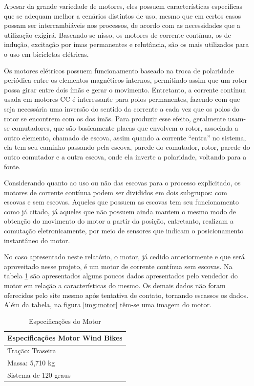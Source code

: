 \newpage
Apesar da grande variedade de motores, eles possuem características específicas que se adequam melhor a cenários distintos de uso, mesmo que em certos casos possam ser intercambiáveis nos processos, de acordo com as necessidades que a utilização exigirá. Baseando-se nisso, os motores de corrente contínua, os de indução, excitação por imas permanentes e relutância, são os mais utilizados para o uso em bicicletas elétricas.

Os motores elétricos possuem funcionamento baseado na troca de polaridade periódica entre os elementos magnéticos internos, permitindo assim que um rotor possa girar entre dois ímãs e gerar o movimento. Entretanto, a corrente contínua usada em motores CC é interessante para polos permanentes, fazendo com que seja necessária uma inversão do sentido da corrente a cada vez que os polos do rotor se encontrem com os dos ímãs. Para produzir esse efeito, geralmente usam-se comutadores, que são basicamente placas que envolvem o rotor, associada a outro elemento, chamado de escova, assim quando a corrente “entra” no sistema, ela tem seu caminho passando pela escova, parede do comutador, rotor, parede do outro comutador e a outra escova, onde ela inverte a polaridade, voltando para a fonte. 
 
 Considerando quanto ao uso ou não das escovas para o processo explicitado, os motores de corrente contínua podem ser divididos em dois subgrupos: com escovas e sem escovas. Aqueles que possuem as escovas tem seu funcionamento como já citado, já aqueles que não possuem ainda mantem o mesmo modo de obtenção do movimento do motor a partir da posição, entretanto, realizam a comutação eletronicamente, por meio de sensores que indicam o posicionamento instantâneo do motor. 

No caso apresentado neste relatório, o motor, já cedido anteriormente e que será aproveitado nesse projeto, é um motor de corrente contínua sem escovas. Na tabela \ref{esp_motor} são apresentados alguns poucos dados apresentados pelo vendedor do motor em relação a características do mesmo. Os demais dados não foram oferecidos pelo site mesmo após tentativa de contato, tornando escassos os dados. Além da tabela, na figura \ref{img:motor} têm-se uma imagem do motor.

\begin{table}[h!]
\centering
\caption{Especificações do Motor}
\label{esp_motor}
\begin{tabular}{|l|}
\hline
Especificações Motor Wind Bikes \\ \hline
Tração: Traseira                \\ \hline
Massa: 5,710 kg                 \\ \hline
Sistema de 120 graus            \\ \hline
\end{tabular}
\end{table}

